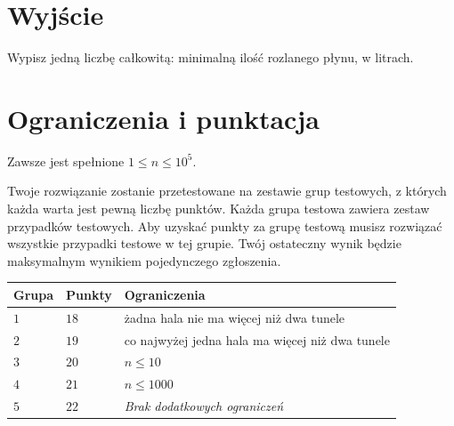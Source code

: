 \section*{Wyjście}

Wypisz jedną liczbę całkowitą: minimalną ilość rozlanego płynu, w litrach.

\section*{Ograniczenia i punktacja}

Zawsze jest spełnione
$1\leq n\leq 10^5$. %

Twoje rozwiązanie zostanie przetestowane na zestawie grup testowych, z których każda warta jest pewną liczbę punktów.
Każda grupa testowa zawiera zestaw przypadków testowych.
Aby uzyskać punkty za grupę testową musisz rozwiązać wszystkie przypadki testowe w tej grupie.
Twój ostateczny wynik będzie maksymalnym wynikiem pojedynczego zgłoszenia.

\medskip
\begin{tabular}{lll}
Grupa & Punkty & Ograniczenia \\\hline
  $1$ & $18$ & żadna hala nie ma więcej niż dwa tunele\\
  $2$ & $19$ & co najwyżej jedna hala ma więcej niż dwa tunele\\
  $3$ & $20$ & $n\leq 10$\\
  $4$ & $21$ & $n\leq 1000$\\
  $5$ & $22$ & \emph{Brak dodatkowych ograniczeń}
\end{tabular}
